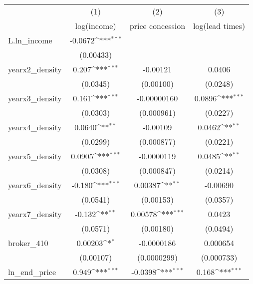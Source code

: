 {
\def\sym#1{\ifmmode^{#1}\else\(^{#1}\)\fi}
\begin{tabular}{l*{3}{c}}
\toprule
            &\multicolumn{1}{c}{(1)}&\multicolumn{1}{c}{(2)}&\multicolumn{1}{c}{(3)}\\
            &\multicolumn{1}{c}{log(income)}&\multicolumn{1}{c}{price concession}&\multicolumn{1}{c}{log(lead times)}\\
\midrule
L.ln\_income &     -0.0672\sym{***}&                     &                     \\
            &   (0.00433)         &                     &                     \\
\addlinespace
yearx2\_density&       0.207\sym{***}&    -0.00121         &      0.0406         \\
            &    (0.0345)         &   (0.00100)         &    (0.0248)         \\
\addlinespace
yearx3\_density&       0.161\sym{***}& -0.00000160         &      0.0896\sym{***}\\
            &    (0.0303)         &  (0.000961)         &    (0.0227)         \\
\addlinespace
yearx4\_density&      0.0640\sym{**} &    -0.00109         &      0.0462\sym{**} \\
            &    (0.0299)         &  (0.000877)         &    (0.0221)         \\
\addlinespace
yearx5\_density&      0.0905\sym{***}&  -0.0000119         &      0.0485\sym{**} \\
            &    (0.0308)         &  (0.000847)         &    (0.0214)         \\
\addlinespace
yearx6\_density&      -0.180\sym{***}&     0.00387\sym{**} &    -0.00690         \\
            &    (0.0541)         &   (0.00153)         &    (0.0357)         \\
\addlinespace
yearx7\_density&      -0.132\sym{**} &     0.00578\sym{***}&      0.0423         \\
            &    (0.0571)         &   (0.00180)         &    (0.0494)         \\
\addlinespace
broker\_410  &     0.00203\sym{*}  &  -0.0000186         &    0.000654         \\
            &   (0.00107)         & (0.0000299)         &  (0.000733)         \\
\addlinespace
ln\_end\_price&       0.949\sym{***}&     -0.0398\sym{***}&       0.168\sym{***}\\

\end{tabular}}
